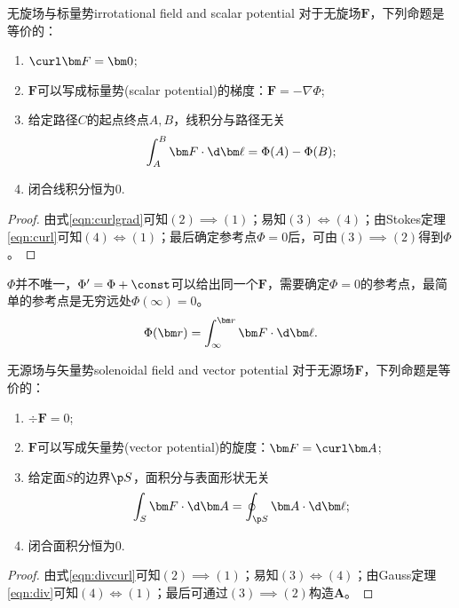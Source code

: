 \begin{theorem}{无旋场与标量势}{irrotational field and scalar potential}
    对于无旋场$\bm F$，下列命题是等价的：
    \begin{enumerate}
        \item $\curl\bm F=\bm 0$;
        \item $\bm F$可以写成标量势(scalar potential)的梯度：$\bm F=-\nabla\Phi$;
        \item 给定路径$C$的起点终点$A,B$，线积分与路径无关
        \begin{equation}
            \int_A^B\bm F\cdot\d\bm\ell=\Phi(A)-\Phi(B);
        \end{equation}
        \item 闭合线积分恒为0.
    \end{enumerate}
\end{theorem}
\begin{proof}
    由式\eqref{eqn:curlgrad}可知$(2)\implies(1)$；易知$(3)\iff(4)$；由Stokes定理\eqref{eqn:curl}可知$(4)\iff(1)$；最后确定参考点$\Phi=0$后，可由$(3)\implies(2)$得到$\Phi$。
\end{proof}
\begin{remark}
    $\Phi$并不唯一，$\Phi'=\Phi+\const$可以给出同一个$\bm F$，需要确定$\Phi=0$的参考点，最简单的参考点是无穷远处$\Phi(\infty)=0$。
    \[
        \Phi(\bm r)=\int_\infty^{\bm r}\bm F\cdot\d\bm\ell.
    \]
\end{remark}

\begin{theorem}{无源场与矢量势}{solenoidal field and vector potential}
    对于无源场$\bm F$，下列命题是等价的：
    \begin{enumerate}
        \item $\div\bm F=0$;
        \item $\bm F$可以写成矢量势(vector potential)的旋度：$\bm F=\curl\bm A$;
        \item 给定面$S$的边界$\p S$，面积分与表面形状无关
        \begin{equation}
            \int_S\bm F\cdot\d\bm A=\oint_{\p S}\bm A\cdot\d\bm\ell;
        \end{equation}
        \item 闭合面积分恒为0.
    \end{enumerate}
\end{theorem}
\begin{proof}
    由式\eqref{eqn:divcurl}可知$(2)\implies(1)$；易知$(3)\iff(4)$；由Gauss定理\eqref{eqn:div}可知$(4)\iff(1)$；最后可通过$(3)\implies(2)$构造$\bm A$。
\end{proof}

